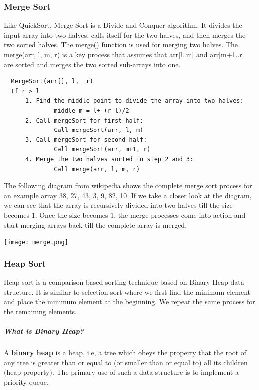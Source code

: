 \documentclass[a4paper, 12pt]{article}
\begin{document}
\newpage

\subsubsection{Merge Sort}

Like QuickSort, Merge Sort is a Divide and Conquer 
algorithm. It divides the input array into two halves, 
calls itself for the two halves, and then merges the two sorted halves. 
The merge() function is used for merging two halves. The merge(arr, l, m, r) 
is a key process that assumes that arr[l..m] and arr[m+1..r] are sorted and 
merges the two sorted sub-arrays into one.

\begin{lstlisting}
  MergeSort(arr[], l,  r)
  If r > l
      1. Find the middle point to divide the array into two halves:  
              middle m = l+ (r-l)/2
      2. Call mergeSort for first half:   
              Call mergeSort(arr, l, m)
      3. Call mergeSort for second half:
              Call mergeSort(arr, m+1, r)
      4. Merge the two halves sorted in step 2 and 3:
              Call merge(arr, l, m, r)
\end{lstlisting}

The following diagram from wikipedia shows the complete merge sort process 
for an example array {38, 27, 43, 3, 9, 82, 10}. If we take a closer look 
at the diagram, we can see that the array is recursively divided into two 
halves till the size becomes 1. Once the size becomes 1, the merge processes 
come into action and start merging arrays back till the complete array is merged.

\begin{center}
  \texttt{[image: merge.png]}
\end{center}

\newpage

\subsubsection{Heap Sort}

Heap sort is a comparison-based sorting technique based on 
Binary Heap data structure. It is similar to selection sort 
where we first find the minimum element and place the minimum element 
at the beginning. We repeat the same process for the remaining elements.

\subparagraph{What is Binary Heap?}

\hfill \break
\indent A \textbf{binary heap} is a heap, i.e, a tree which obeys 
the property that the root of any tree is greater 
than or equal to (or smaller than or equal to) all 
its children (heap property). The primary use of such a data structure is 
to implement a priority queue.
\end{document}
